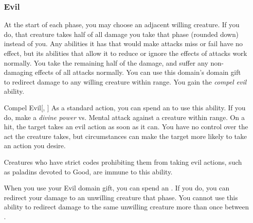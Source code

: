         \subsubsection{Evil}
             At the start of each phase, you may choose an adjacent willing creature.
            If you do, that creature takes half of all damage you take that phase (rounded down) instead of you.
            Any abilities it has that would make attacks miss or fail have no effect, but its abilities that allow it to reduce or ignore the effects of attacks work normally.
            You take the remaining half of the damage, and suffer any non-damaging effects of all attacks normally.
             You can use this domain's domain gift to redirect damage to any willing creature within \rngclose range.
             You gain the \textit{compel evil} ability.
            \begin{ability}{Compel Evil}[, ]
                As a standard action, you can spend an  to use this ability.
                If you do, make a \textit{divine power} vs. Mental attack against a creature within \rngmed range.
                On a hit, the target takes an evil action as soon as it can.
                You have no control over the act the creature takes, but circumstances can make the target more likely to take an action you desire.

                Creatures who have strict codes prohibiting them from taking evil actions, such as paladins devoted to Good, are immune to this ability.
            \end{ability}
             When you use your Evil domain gift, you can spend an .
            If you do, you can redirect your damage to an unwilling creature that phase.
            You cannot use this ability to redirect damage to the same unwilling creature more than once between .

